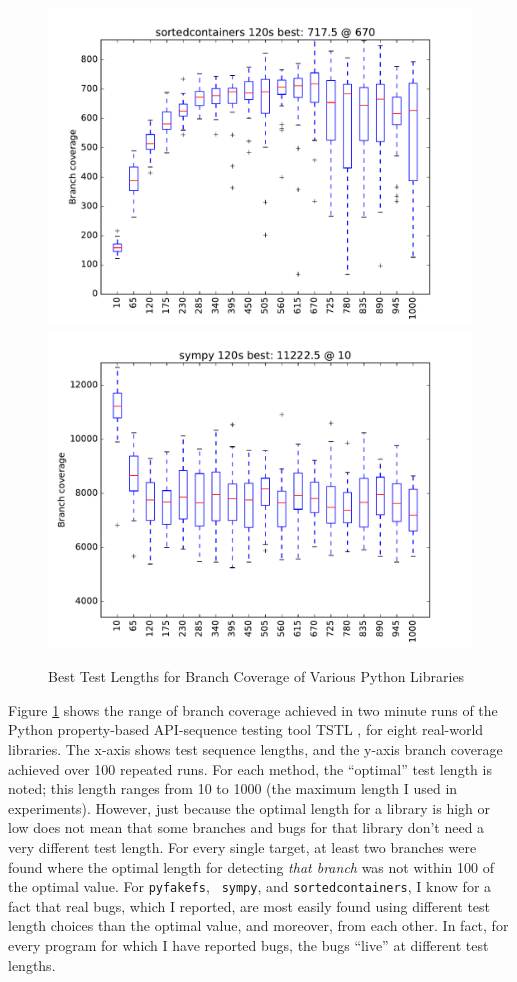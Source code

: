 \documentclass[sigplan]{acmart}
\begin{document}
\begin{figure}
\includegraphics[width=0.9\columnwidth]{graphs/sortedcontainersrand120}
\includegraphics[width=0.9\columnwidth]{graphs/sympyrand120}
\caption{Best Test Lengths for Branch Coverage of Various Python
  Libraries}
\label{fig:length}

\end{figure}

Figure \ref{fig:length} shows the range of branch coverage achieved in
two minute runs of the Python property-based API-sequence testing tool
TSTL \cite{tstlsttt}, for
eight real-world libraries.  The x-axis shows test sequence lengths,
and the y-axis branch coverage achieved over 100 repeated runs.  For
each method, the ``optimal'' test length is noted; this length ranges
from 10 to 1000 (the maximum length I used in experiments).  However,
just because the optimal length for a library is high or low does not
mean that some branches and bugs for that library don't need a very
different test length.  For every single target, at least two branches
were found where the optimal length for detecting \emph{that branch}
was not within 100 of the optimal value.  For {\tt pyfakefs}, {\tt
  sympy}, and {\tt sortedcontainers}, I know for a fact that real
bugs, which I reported, are most easily found using different test
length choices than the optimal value, and moreover, from each other.
In fact, for every program for which I have reported bugs, the bugs
``live'' at different test lengths.
\end{document}
